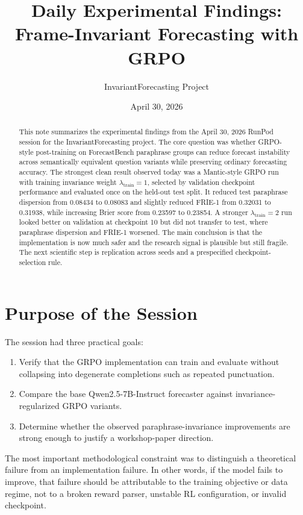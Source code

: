 \documentclass[11pt]{article}
\title{Daily Experimental Findings: Frame-Invariant Forecasting with GRPO}
\author{InvariantForecasting Project}
\date{April 30, 2026}
\begin{document}
\maketitle

\begin{abstract}
This note summarizes the experimental findings from the April 30, 2026
RunPod session for the InvariantForecasting project. The core question was
whether GRPO-style post-training on ForecastBench paraphrase groups can reduce
forecast instability across semantically equivalent question variants while
preserving ordinary forecasting accuracy. The strongest clean result observed
today was a Mantic-style GRPO run with training invariance weight
$\lambda_{\mathrm{train}}=1$, selected by validation checkpoint performance and
evaluated once on the held-out test split. It reduced test paraphrase dispersion
from 0.08434 to 0.08083 and slightly reduced FRIE-1 from 0.32031 to 0.31938,
while increasing Brier score from 0.23597 to 0.23854. A stronger
$\lambda_{\mathrm{train}}=2$ run looked better on validation at checkpoint 10
but did not transfer to test, where paraphrase dispersion and FRIE-1 worsened.
The main conclusion is that the implementation is now much safer and the
research signal is plausible but still fragile. The next scientific step is
replication across seeds and a prespecified checkpoint-selection rule.
\end{abstract}

\section{Purpose of the Session}

The session had three practical goals:

\begin{enumerate}
  \item Verify that the GRPO implementation can train and evaluate without
  collapsing into degenerate completions such as repeated punctuation.
  \item Compare the base Qwen2.5-7B-Instruct forecaster against
  invariance-regularized GRPO variants.
  \item Determine whether the observed paraphrase-invariance improvements are
  strong enough to justify a workshop-paper direction.
\end{enumerate}

The most important methodological constraint was to distinguish a theoretical
failure from an implementation failure. In other words, if the model fails to
improve, that failure should be attributable to the training objective or data
regime, not to a broken reward parser, unstable RL configuration, or invalid
checkpoint.
\end{document}
